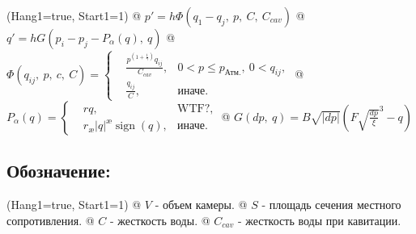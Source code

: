 \documentclass[12pt, a4paper]{article}
\DeclareMathOperator{\sign}{sign}
\begin{document}
\noindent\begin{easylist}
\ListProperties(Hang1=true, Start1=1)
@ $ p' = h \Phi(q_1 - q_j,\ p,\ C,\ C_{cav}) $
@ $ q' = h G(p_i-p_j-P_\alpha(q),\ q) $
@ $
\Phi(q_{ij},\ p,\ c,\ C) = \left\{
\begin{aligned}
&\frac{p^{\left(1+\frac{1}{\gamma}\right)}q_{ij}}{C_{cav}},  & 0 < p \leqslant p_{\text{Атм.}},\ 0 < q_{ij}, \\
& \frac{q_{ij}}{C}, & \text{иначе.}
\end{aligned}
\right.
$
@ $
P_\alpha(q) = \left\{
\begin{aligned}
&rq,  &\text{WTF?}, \\
&r_\text{\ae}|q|^\text{\ae}\sign(q), & \text{иначе.}
\end{aligned}
\right.
$
@ $ G(dp,\ q) = B\sqrt{|dp|}(F\sqrt{\frac{dp}{\xi}}^3 - q) $
\end{easylist}

\subsection{Обозначение:}

\noindent\begin{easylist}
\ListProperties(Hang1=true, Start1=1)
@ $ V $ - объем камеры. 
@ $ S $ - площадь сечения местного сопротивления.
@ $ C $ - жесткость воды.
@ $ C_{cav} $ - жесткость воды при кавитации.
\end{easylist}
\end{document}
